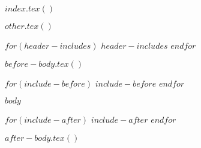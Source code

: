 $index.tex()$

$other.tex()$

$for(header-includes)$
$header-includes$
$endfor$





\pretextual

$before-body.tex()$

$for(include-before)$
$include-before$
$endfor$


\textual
$body$

$for(include-after)$
$include-after$
$endfor$

$after-body.tex()$

